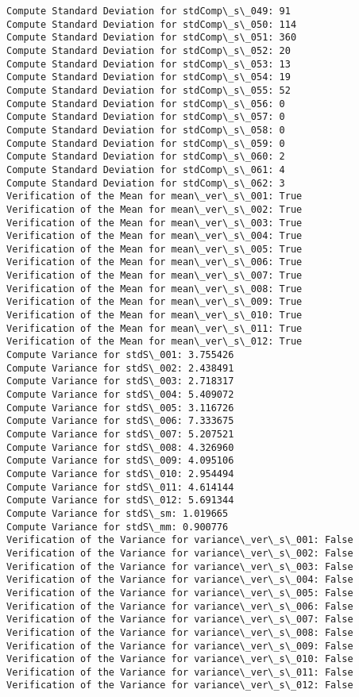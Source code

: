 \documentclass[11pt]{article}
\begin{document}
\begin{Verbatim}[commandchars=\\\{\}]
Compute Standard Deviation for stdComp\_s\_049: 91
Compute Standard Deviation for stdComp\_s\_050: 114
Compute Standard Deviation for stdComp\_s\_051: 360
Compute Standard Deviation for stdComp\_s\_052: 20
Compute Standard Deviation for stdComp\_s\_053: 13
Compute Standard Deviation for stdComp\_s\_054: 19
Compute Standard Deviation for stdComp\_s\_055: 52
Compute Standard Deviation for stdComp\_s\_056: 0
Compute Standard Deviation for stdComp\_s\_057: 0
Compute Standard Deviation for stdComp\_s\_058: 0
Compute Standard Deviation for stdComp\_s\_059: 0
Compute Standard Deviation for stdComp\_s\_060: 2
Compute Standard Deviation for stdComp\_s\_061: 4
Compute Standard Deviation for stdComp\_s\_062: 3
Verification of the Mean for mean\_ver\_s\_001: True
Verification of the Mean for mean\_ver\_s\_002: True
Verification of the Mean for mean\_ver\_s\_003: True
Verification of the Mean for mean\_ver\_s\_004: True
Verification of the Mean for mean\_ver\_s\_005: True
Verification of the Mean for mean\_ver\_s\_006: True
Verification of the Mean for mean\_ver\_s\_007: True
Verification of the Mean for mean\_ver\_s\_008: True
Verification of the Mean for mean\_ver\_s\_009: True
Verification of the Mean for mean\_ver\_s\_010: True
Verification of the Mean for mean\_ver\_s\_011: True
Verification of the Mean for mean\_ver\_s\_012: True
Compute Variance for stdS\_001: 3.755426
Compute Variance for stdS\_002: 2.438491
Compute Variance for stdS\_003: 2.718317
Compute Variance for stdS\_004: 5.409072
Compute Variance for stdS\_005: 3.116726
Compute Variance for stdS\_006: 7.333675
Compute Variance for stdS\_007: 5.207521
Compute Variance for stdS\_008: 4.326960
Compute Variance for stdS\_009: 4.095106
Compute Variance for stdS\_010: 2.954494
Compute Variance for stdS\_011: 4.614144
Compute Variance for stdS\_012: 5.691344
Compute Variance for stdS\_sm: 1.019665
Compute Variance for stdS\_mm: 0.900776
Verification of the Variance for variance\_ver\_s\_001: False
Verification of the Variance for variance\_ver\_s\_002: False
Verification of the Variance for variance\_ver\_s\_003: False
Verification of the Variance for variance\_ver\_s\_004: False
Verification of the Variance for variance\_ver\_s\_005: False
Verification of the Variance for variance\_ver\_s\_006: False
Verification of the Variance for variance\_ver\_s\_007: False
Verification of the Variance for variance\_ver\_s\_008: False
Verification of the Variance for variance\_ver\_s\_009: False
Verification of the Variance for variance\_ver\_s\_010: False
Verification of the Variance for variance\_ver\_s\_011: False
Verification of the Variance for variance\_ver\_s\_012: False

\end{Verbatim}
\end{document}
